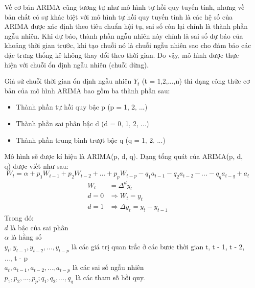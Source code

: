 \documentclass[12pt,a4paper]{report}
\begin{document}
Về cơ bản ARIMA cũng tương tự như mô hình tự hồi quy tuyến tính, nhưng về bản chất có sự khác biệt với mô hình tự hồi quy tuyến tính là các hệ số của ARIMA được xác định theo tiêu chuẩn hội tụ, sai số còn lại chính là thành phần ngẫu nhiên. Khi dự báo, thành phần ngẫu nhiên này chính là sai số dự báo của khoảng thời gian trước, khi tạo chuỗi nó là chuỗi ngẫu nhiên sao cho đảm bảo các đặc trưng thống kê không thay đổi theo thời gian. Do vậy, mô hình được thực hiện với chuỗi ổn định ngẫu nhiên (chuỗi dừng).

Giả sử chuỗi thời gian ổn định ngẫu nhiên $Y_t$ (t = 1,2,...,n) thì dạng công thức cơ bản của mô hình ARIMA bao gồm ba thành phần sau:
	\begin{itemize}
		\item Thành phần tự hồi quy bậc p (p = 1, 2, ...)
		\item Thành phần sai phân bậc d (d = 0, 1, 2, ...)
		\item Thành phần trung bình trượt bậc q (q = 1, 2, ...)
	\end{itemize}
Mô hình sẽ được kí hiệu là ARIMA(p, d, q). Dạng tổng quát của ARIMA(p, d, q) được viết như sau:
	\begin{equation}\label{eqn:5}
		W_t = \alpha + p_1W_{t-1} + p_2W_{t-2} + ... + p_pW_{t-p} - q_1a_{t-1} - q_2a_{t-2} - ... - q_qa_{t-q} + a_t
	\end{equation}
	\begin{equation}
	\begin{split}
		W_t &= \Delta^dy_t\\
		d = 0 &\Rightarrow W_t = y_t\\
		d = 1 &\Rightarrow \Delta{} y_t = y_t - y_{t-1}
	\end{split}
	\end{equation}
Trong đó:\\
\hspace*{1cm}$d$ là bậc của sai phân\\
\hspace*{1cm}$\alpha$ là hằng số\\
\hspace*{1cm}$y_t, y_{t-1}, y_{t-2}, ..., y_{t-p}$ là các giá trị quan trắc ở các bươc thời gian t, t - 1, t - 2, ..., t - p\\
\hspace*{1cm}$a_t, a_{t-1}, a_{t-2}, ..., a_{t-p}$ là các sai số ngẫu nhiên\\
\hspace*{1cm}$p_1, p_2, ...,p_p; q_1, q_2, ...,q_q$ là các tham số hồi quy.
\end{document}
